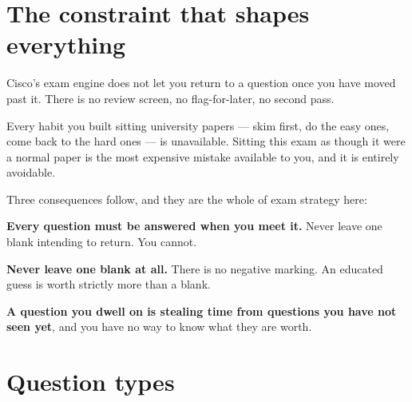 \section{The constraint that shapes everything}

\begin{alertbox}
Cisco's exam engine does not let you return to a question once you have moved
past it. There is no review screen, no flag-for-later, no second pass.

Every habit you built sitting university papers --- skim first, do the easy ones,
come back to the hard ones --- is unavailable. Sitting this exam as though it
were a normal paper is the most expensive mistake available to you, and it is
entirely avoidable.

Three consequences follow, and they are the whole of exam strategy here:

\begin{tight}
  \item \textbf{Every question must be answered when you meet it.} Never leave
        one blank intending to return. You cannot.
  \item \textbf{Never leave one blank at all.} There is no negative marking. An
        educated guess is worth strictly more than a blank.
  \item \textbf{A question you dwell on is stealing time from questions you have
        not seen yet}, and you have no way to know what they are worth.
\end{tight}
\end{alertbox}

\section{Question types}

